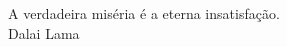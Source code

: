 \begin{epigrafe}
\vspace*{\fill}

\flushright
\begin{minipage}[b][8cm][b]{8.5cm}
A verdadeira miséria é a eterna insatisfação.\\
\flushright
Dalai Lama
\end{minipage}


\end{epigrafe}
